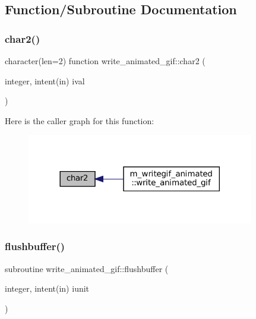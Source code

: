 \subsection{Function/\+Subroutine Documentation}
\mbox{\label{M__writegif__animated_8f90_a795066c06f318c8d4ba41430b6826567}} 
\subsubsection{\texorpdfstring{char2()}{char2()}}
{\footnotesize\ttfamily character(len=2) function write\+\_\+animated\+\_\+gif\+::char2 (\begin{DoxyParamCaption}\item[{integer, intent(in)}]{ival }\end{DoxyParamCaption})\hspace{0.3cm}{\ttfamily [private]}}

Here is the caller graph for this function\+:
\nopagebreak
\begin{figure}[H]
\begin{center}
\leavevmode
\includegraphics[width=281pt]{M__writegif__animated_8f90_a795066c06f318c8d4ba41430b6826567_icgraph}
\end{center}
\end{figure}
\mbox{\label{M__writegif__animated_8f90_a83cb0569b0e010d8ad27afd1b4cd945e}} 
\subsubsection{\texorpdfstring{flushbuffer()}{flushbuffer()}}
{\footnotesize\ttfamily subroutine write\+\_\+animated\+\_\+gif\+::flushbuffer (\begin{DoxyParamCaption}\item[{integer, intent(in)}]{iunit }\end{DoxyParamCaption})\hspace{0.3cm}{\ttfamily [private]}}

